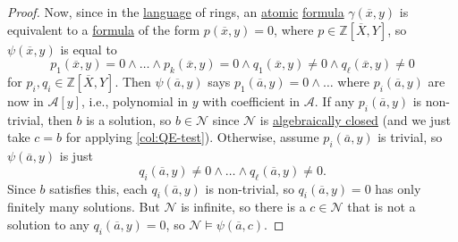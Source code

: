 \begin{proof}
	Now, since in the \hyperref[def:language]{language} of rings, an \hyperref[not:atomic]{atomic} \hyperref[def:formula]{formula} \(\gamma (\overline{x} , y)\) is equivalent to a \hyperref[def:formula]{formula} of the form \(p(\overline{x} , y) = 0\), where \(p\in \mathbb{Z} [\overline{X} , Y]\), so \(\psi (\overline{x} , y)\) is equal to
	\[
		p_1(\overline{x} , y) = 0 \land \ldots \land p_k(\overline{x} , y) = 0 \land q_1(\overline{x} , y) \neq 0 \land q_{\ell } (\overline{x} , y) \neq 0
	\]
	for \(p_i, q_i\in \mathbb{Z} [\overline{X} , Y]\). Then \(\psi (\overline{a} , y)\) says \(p_1(\overline{a} , y) = 0 \land \ldots\) where \(p_i(\overline{a} , y)\) are now in \(\mathcal{A} [y]\), i.e., polynomial in \(y\) with coefficient in \(\mathcal{A} \). If any \(p_i(\overline{a} , y)\) is non-trivial, then \(b\) is a solution, so \(b\in \mathcal{N} \) since \(\mathcal{N} \) is \hyperref[def:algebraically-closed]{algebraically closed} (and we just take \(c = b\) for applying \autoref{col:QE-test}). Otherwise, assume \(p_i(\overline{a} , y)\) is trivial, so \(\psi (\overline{a} ,y)\) is just
	\[
		q_i(\overline{a} , y) \neq 0 \land \ldots \land q_{\ell } (\overline{a} , y) \neq 0.
	\]
	Since \(b\) satisfies this, each \(q_i(\overline{a} , y)\) is non-trivial, so \(q_i(\overline{a} , y) = 0\) has only finitely many solutions. But \(\mathcal{N} \) is infinite, so there is a \(c\in \mathcal{N} \) that is not a solution to any \(q_i(\overline{a} , y) = 0\), so \(\mathcal{N} \models \psi (\overline{a} , c)\).
\end{proof}